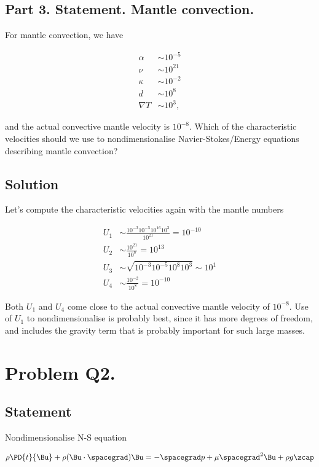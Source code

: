 \subsection{Part 3.  Statement.  Mantle convection.}

For mantle convection, we have

\begin{align*}
\alpha &\sim 10^{-5} \\
\nu &\sim 10^{21} \\
\kappa &\sim 10^{-2} \\
d &\sim 10^8 \\
\nabla T &\sim 10^3,
\end{align*}

and the actual convective mantle velocity is $10^{-8}$.  Which of the characteristic velocities should we use to nondimensionalise Navier-Stokes/Energy equations describing mantle convection?
\subsection{Solution}

Let's compute the characteristic velocities again with the mantle numbers

\begin{align}\label{eqn:continuumProblemSet3:210}
U_1 &\sim \frac{10^{-3} 10^{-5} 10^{16} 10^3 }{10^{21}} = 10^{-10} \\
U_2 &\sim \frac{10^{21}}{10^8} = 10^{13} \\
U_3 &\sim \sqrt{ 10^{-3} 10^{-5} 10^8 10^3 } \sim 10^1 \\
U_4 &\sim \frac{10^{-2}}{10^8} = 10^{-10}
\end{align}

Both $U_1$ and $U_4$ come close to the actual convective mantle velocity of $10^{-8}$.  Use of $U_1$ to nondimensionalise is probably best, since it has more degrees of freedom, and includes the gravity term that is probably important for such large masses.

\section{Problem Q2.}
\subsection{Statement}

Nondimensionalise N-S equation

\begin{equation}\label{eqn:continuumL19:230}
\rho \PD{t}{\Bu} + \rho (\Bu \cdot \spacegrad) \Bu = - \spacegrad p + \mu \spacegrad^2 \Bu + \rho g \zcap
\end{equation}

